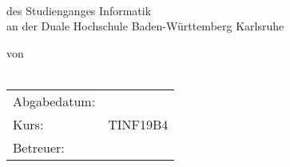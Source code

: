 
\begin{titlepage}
	\sffamily
	
	\logodhbw \hfill \\[2ex]
	
	\begin{center}
		\huge{\textsc{\textbf{\theTitle}}}
		\\[6ex]
		\Large{\textbf{\theSubtitle}}
		\\
		\Large{des Studienganges Informatik}
		\\
		\Large{an der Duale Hochschule Baden-Württemberg Karlsruhe}
		\\[7ex]
		
		\normalsize{
			von
			\\
			\theAuthor
			\\[15ex]
			
			\begin{tabular}{ll}
				Abgabedatum:		& \quad \deadline \\
				Kurs:				& \quad TINF19B4 \\ 
				Betreuer:			& \quad \supervisor \\
			\end{tabular}
		}
	\end{center}
\end{titlepage}
